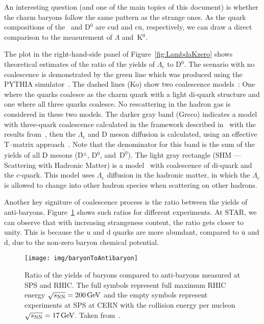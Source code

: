 An interesting question (and one of the main topics of this document) is whether the charm baryons follow the same pattern as the strange ones. As the quark compositions of the \Lambdac\ and D$^0$ are cud and c$\overline{\mathrm{u}}$, respectively, we can draw a direct comparison to the measurement of $\Lambda$ and~K$^0$.

The plot in the right-hand-side panel of Figure~\ref{fig:LambdaKzero} shows theoretical estimates of the ratio of the yields of $\Lambda_\mathrm{c}$ to D$^0$. The scenario with no coalescence is demonstrated by the green line which was produced using the PYTHIA simulator~\cite{PYTHIA}. The dashed lines (Ko) show two coalescence models~\cite{LcCoalescence_OhKoLeeYasui}: One where the  quarks coalesce as the charm quark with a light di-quark structure and one where all three quarks coalesce. No rescattering in the hadron gas is considered in these two models. The darker gray band (Greco) indicates a model with three-quark coalescence calculated in the framework described in~\cite{Greco_framework} with the results from~\cite{Greco_results}, then the $\Lambda_\mathrm{c}$ and D meson diffusion is calculated, using an effective T--matrix approach~\cite{Ghosh_Lc_rescattering}. Note that the denominator for this band is the sum of the yields of all D mesons (D$^\pm$, D$^0$, and~$\mathrm{\overline{D^0}}$). The light gray rectangle (SHM --- Scattering with Hadronic Matter) is a model~\cite{SHM} with coalescence of di-quark and the c-quark. This model uses $\Lambda_\mathrm{c}$ diffusion in the hadronic matter, in which the $\Lambda_\mathrm{c}$ is allowed to change into other hadron species when scattering on other hadrons.

Another key signiture of coalescence process is the ratio between the yields of anti-baryons. Figure~\ref{fig:BtoAntiB} shows such ratios for different experiments. At STAR, we can observe that with increasing strangeness content, the ratio gets closer to unity. This is because the u and d quarks are more abundant, compared to $\overline{\mathrm{u}}$ and $\overline{\mathrm{d}}$, due to the non-zero baryon chemical potential. 

\begin{figure}
\centering
\texttt{[image: img/baryonToAntibaryon]}
\caption[Ratio of the yields of baryons compared to anti-baryons measured at SPS and~RHIC\@.]{Ratio of the yields of baryons compared to anti-baryons measured at SPS and RHIC\@. The full symbols represent full maximum RHIC energy $\sqrt{s_\text{NN}} = \SI{200}{GeV}$ and the empty symbols represent experiments at SPS at CERN with the collision energy per nucleon $\sqrt{s_\text{NN}} = \SI{17}{GeV}$. Taken from~\cite{BtoAntiB}.}
\label{fig:BtoAntiB}
\end{figure}



